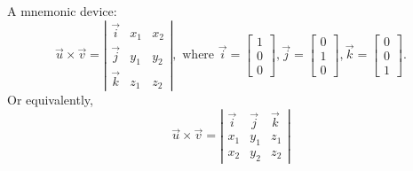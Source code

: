 \documentclass[pdf,9pt]{beamer}
\begin{document}
{{}
\begin{frame}[fragile]
\begin{remark}
    \alert{A mnemonic device:}
    \[
    \vec{u}\times\vec{v} =
    \left|\begin{array}{ccc}
	\vec{i} & x_1 & x_2 \\
	\vec{j} & y_1 & y_2 \\
	\vec{k} & z_1 & z_2
    \end{array}\right|,
    \mbox{ where }
    \vec{i} =
    \left[\begin{array}{c}
    1 \\ 0 \\ 0 \end{array}\right],
    \vec{j} =
    \left[\begin{array}{c}
    0 \\ 1 \\ 0 \end{array}\right],
    \vec{k} =
    \left[\begin{array}{c}
    0 \\ 0 \\ 1 \end{array}\right].
    \]
    Or equivalently,
    \[
    \vec{u}\times\vec{v} =
    \left|\begin{array}{ccc}
	\vec{i} & \vec{j} & \vec{k} \\
	 x_1    & y_1     & z_1     \\
	 x_2    & y_2     & z_2
    \end{array}\right|
    \]
\end{remark}
\end{frame}
}
\end{document}
